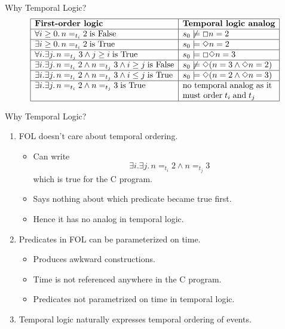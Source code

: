 \begin{wideslide}[bm=,toc=]{Why Temporal Logic?}
\begin{displaymath}
\begin{array}{|l|l|}
\hline
\mbox{\bf First-order logic} & \mbox{\bf Temporal logic analog} \\\hline
\forall i\geq 0.\, n=_{t_i}2\;\mbox{\rm is False} & s_0\not\models\Box n = 2\\\hline
\exists i\geq 0.\, n=_{t_i}2\;\mbox{\rm is True}  & s_0\models\Diamond n = 2\\\hline
\forall i.\exists j.\, n=_{t_j}3 \wedge j\geq i\;\mbox{\rm is True} & s_0\models\Box\Diamond n = 3\\\hline
\exists i.\exists j.\, n =_{t_i}2 \wedge n=_{t_j}3 \wedge i \geq j\;\mbox{\rm is False} & 
s_0\not\models\Diamond (n = 3\wedge\Diamond n = 2)\\\hline
\exists i.\exists j.\, n =_{t_i}2 \wedge n=_{t_j}3 \wedge i \leq j\;\mbox{\rm is True} & 
s_0\models\Diamond (n = 2\wedge\Diamond n = 3)\\\hline
\exists i.\exists j.\, n =_{t_i}2 \wedge n=_{t_j}3\;\mbox{\rm is True} & 
\mbox{\rm no temporal analog as it} \\
 & \mbox{\rm must order}\;t_i\;\mbox{\rm and}\;t_j\\\hline
\end{array}
\end{displaymath}
\end{wideslide}

\begin{wideslide}[bm=,toc=]{Why Temporal Logic?}
\begin{enumerate}
\item FOL doesn't care about temporal ordering.  
\begin{itemize}
\item Can write
\begin{displaymath}
\exists i.\exists j.\, n =_{t_i}2 \wedge n=_{t_j}3
\end{displaymath}
which is true for the C program.
\item Says nothing about which predicate became true first.
\item Hence it has no analog in temporal logic.
\end{itemize}
\item Predicates in FOL can be parameterized on time.
\begin{itemize}
\item Produces awkward constructions.
\item Time is not referenced anywhere in the C program.
\item Predicates not parametrized on time in temporal logic.
\end{itemize}
\item Temporal logic naturally expresses temporal ordering of events.
\end{enumerate}
\end{wideslide}
